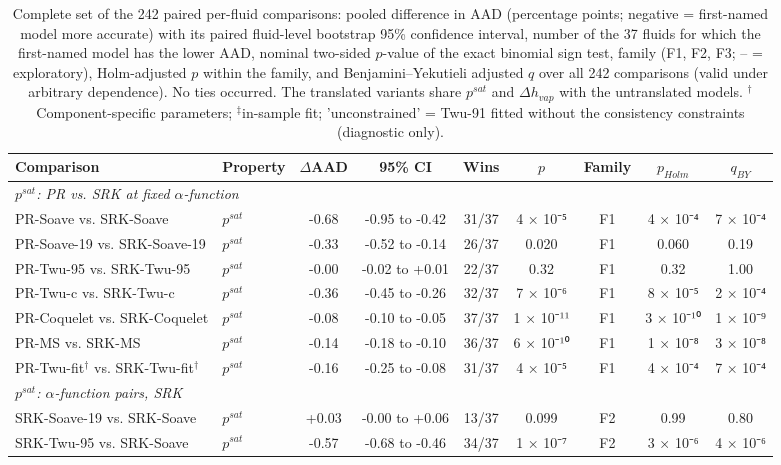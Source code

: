 \begin{table}[H]
\centering
\caption{Complete set of the 242 paired per-fluid comparisons: pooled difference in AAD (percentage points; negative = first-named model more accurate) with its paired fluid-level bootstrap 95\% confidence interval, number of the 37 fluids for which the first-named model has the lower AAD, nominal two-sided $p$-value of the exact binomial sign test, family (F1, F2, F3; -- = exploratory), Holm-adjusted $p$ within the family, and Benjamini--Yekutieli adjusted $q$ over all 242 comparisons (valid under arbitrary dependence). No ties occurred. The translated variants share $p^{sat}$ and $\Delta h_{vap}$ with the untranslated models. $^{\dagger}$Component-specific parameters; $^{\ddagger}$in-sample fit; 'unconstrained' = Twu-91 fitted without the consistency constraints (diagnostic only).}
\label{tab:tabS_signtests_full}
\small
\begin{tabular}{llccccccc}
\toprule
Comparison & Property & $\Delta$AAD & 95\% CI & Wins & $p$ & Family & $p_{Holm}$ & $q_{BY}$ \\
\midrule
\multicolumn{9}{l}{\emph{$p^{sat}$: PR vs. SRK at fixed $\alpha$-function}} \\
PR-Soave vs. SRK-Soave & $p^{sat}$ & -0.68 & -0.95 to -0.42 & 31/37 & 4 × 10⁻⁵ & F1 & 4 × 10⁻⁴ & 7 × 10⁻⁴ \\
PR-Soave-19 vs. SRK-Soave-19 & $p^{sat}$ & -0.33 & -0.52 to -0.14 & 26/37 & 0.020 & F1 & 0.060 & 0.19 \\
PR-Twu-95 vs. SRK-Twu-95 & $p^{sat}$ & -0.00 & -0.02 to +0.01 & 22/37 & 0.32 & F1 & 0.32 & 1.00 \\
PR-Twu-c vs. SRK-Twu-c & $p^{sat}$ & -0.36 & -0.45 to -0.26 & 32/37 & 7 × 10⁻⁶ & F1 & 8 × 10⁻⁵ & 2 × 10⁻⁴ \\
PR-Coquelet vs. SRK-Coquelet & $p^{sat}$ & -0.08 & -0.10 to -0.05 & 37/37 & 1 × 10⁻¹¹ & F1 & 3 × 10⁻¹⁰ & 1 × 10⁻⁹ \\
PR-MS vs. SRK-MS & $p^{sat}$ & -0.14 & -0.18 to -0.10 & 36/37 & 6 × 10⁻¹⁰ & F1 & 1 × 10⁻⁸ & 3 × 10⁻⁸ \\
PR-Twu-fit$^{\dagger}$ vs. SRK-Twu-fit$^{\dagger}$ & $p^{sat}$ & -0.16 & -0.25 to -0.08 & 31/37 & 4 × 10⁻⁵ & F1 & 4 × 10⁻⁴ & 7 × 10⁻⁴ \\
\multicolumn{9}{l}{\emph{$p^{sat}$: $\alpha$-function pairs, SRK}} \\
SRK-Soave-19 vs. SRK-Soave & $p^{sat}$ & +0.03 & -0.00 to +0.06 & 13/37 & 0.099 & F2 & 0.99 & 0.80 \\
SRK-Twu-95 vs. SRK-Soave & $p^{sat}$ & -0.57 & -0.68 to -0.46 & 34/37 & 1 × 10⁻⁷ & F2 & 3 × 10⁻⁶ & 4 × 10⁻⁶ \\

\end{tabular}
\end{table}
